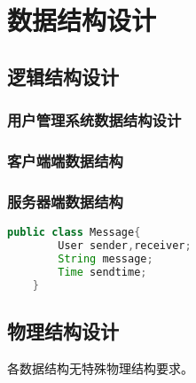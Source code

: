 \chapter{数据结构设计}
    \section{逻辑结构设计}
        \subsection{用户管理系统数据结构设计}
        \subsection{客户端端数据结构}
        \subsection{服务器端数据结构}
    \begin{lstlisting}[language=Java, caption=示例代码, label={code:first-code}]
    public class Message{
        User sender,receiver;
        String message;
        Time sendtime;
    }
    \end{lstlisting}

    \section{物理结构设计}
        各数据结构无特殊物理结构要求。
